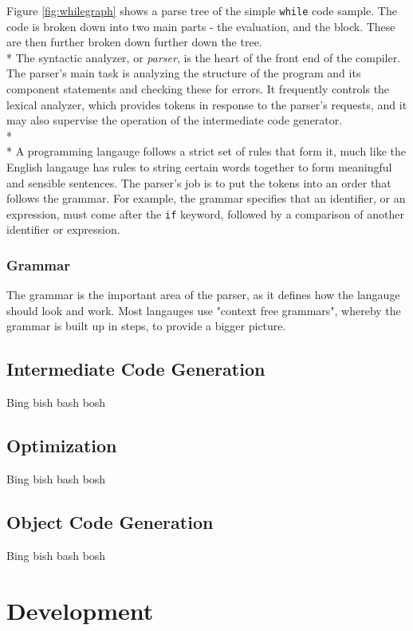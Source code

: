 \documentclass[12pt]{report}
\begin{document}
Figure \ref{fig:whilegraph} shows a parse tree of the simple \texttt{while} code sample.  The code is broken down into two main parts - the evaluation, and the block.  These are then further broken down further down the tree.
\\*
The syntactic analyzer, or \textit{parser}, is the heart of the front end of the compiler.  The parser's main task is analyzing the structure of the program and its component statements and checking these for errors.  It frequently controls the lexical analyzer, which provides tokens in response to the parser's requests, and it may also supervise the operation of the intermediate code generator.\citep{compilerconstruction92}
\\*
\\*
A programming langauge follows a strict set of rules that form it, much like the English langauge has rules to string certain words together to form meaningful and sensible sentences.  The parser's job is to put the tokens into an order that follows the grammar.  For example, the grammar specifies that an identifier, or an expression, must come after the \texttt{if} keyword, followed by a comparison of another identifier or expression.
\subsubsection{Grammar}\label{subsubsec:grammar}
The grammar is the important area of the parser, as it defines how the langauge should look and work.  Most langauges use "context free grammars", whereby the grammar is built up in steps, to provide a bigger picture.
\subsection{Intermediate Code Generation}\label{subsec:intermediate_code_gen}
Bing bish bash bosh
\subsection{Optimization}\label{subsec:optimization}
Bing bish bash bosh
\subsection{Object Code Generation}\label{subsec:object_code_gen}
Bing bish bash bosh
\section{Development}\label{sec:development}
\end{document}
